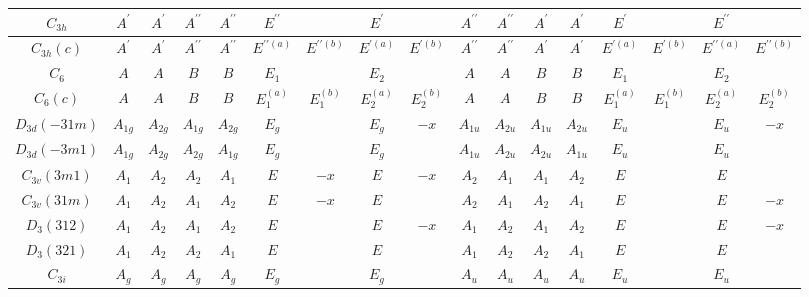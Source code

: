 \documentclass[11pt]{easymemo}
\begin{document}
\begin{landscape}
\begin{table}[ht!]
\begin{center}
\begin{tabular}{c||c|c|c|c|cc|cc||c|c|c|c|cc|cc}
$ C_{3h} $ & $ A^{\prime} $ & $ A^{\prime} $ & $ A^{\prime\prime} $ & $ A^{\prime\prime} $ & $ E^{\prime\prime} $ & & $ E^{\prime} $ & & $ A^{\prime\prime} $ & $ A^{\prime\prime} $ & $ A^{\prime} $ & $ A^{\prime} $ & $ E^{\prime} $ & & $ E^{\prime\prime} $ & \\ \hline
$ C_{3h}(c) $ & $ A^{\prime} $ & $ A^{\prime} $ & $ A^{\prime\prime} $ & $ A^{\prime\prime} $ & $ E^{\prime\prime(a)} $ & $ E^{\prime\prime(b)} $ & $ E^{\prime(a)} $ & $ E^{\prime(b)} $ & $ A^{\prime\prime} $ & $ A^{\prime\prime} $ & $ A^{\prime} $ & $ A^{\prime} $ & $ E^{\prime(a)} $ & $ E^{\prime(b)} $ & $ E^{\prime\prime(a)} $ & $ E^{\prime\prime(b)} $ \\ \hline
$ C_{6} $ & $ A $ & $ A $ & $ B $ & $ B $ & $ E_{1} $ & & $ E_{2} $ & & $ A $ & $ A $ & $ B $ & $ B $ & $ E_{1} $ & & $ E_{2} $ & \\ \hline
$ C_{6}(c) $ & $ A $ & $ A $ & $ B $ & $ B $ & $ E_{1}^{(a)} $ & $ E_{1}^{(b)} $ & $ E_{2}^{(a)} $ & $ E_{2}^{(b)} $ & $ A $ & $ A $ & $ B $ & $ B $ & $ E_{1}^{(a)} $ & $ E_{1}^{(b)} $ & $ E_{2}^{(a)} $ & $ E_{2}^{(b)} $ \\ \hline\hline
$ D_{3d}(-31m) $ & $ A_{1g} $ & $ A_{2g} $ & $ A_{1g} $ & $ A_{2g} $ & $ E_{g} $ & & $ E_{g} $ & $ -x $ & $ A_{1u} $ & $ A_{2u} $ & $ A_{1u} $ & $ A_{2u} $ & $ E_{u} $ & & $ E_{u} $ & $ -x $ \\ \hline
$ D_{3d}(-3m1) $ & $ A_{1g} $ & $ A_{2g} $ & $ A_{2g} $ & $ A_{1g} $ & $ E_{g} $ & & $ E_{g} $ & & $ A_{1u} $ & $ A_{2u} $ & $ A_{2u} $ & $ A_{1u} $ & $ E_{u} $ & & $ E_{u} $ & \\ \hline
$ C_{3v}(3m1) $ & $ A_{1} $ & $ A_{2} $ & $ A_{2} $ & $ A_{1} $ & $ E $ & $ -x $ & $ E $ & $ -x $ & $ A_{2} $ & $ A_{1} $ & $ A_{1} $ & $ A_{2} $ & $ E $ & & $ E $ & \\ \hline
$ C_{3v}(31m) $ & $ A_{1} $ & $ A_{2} $ & $ A_{1} $ & $ A_{2} $ & $ E $ & $ -x $ & $ E $ & & $ A_{2} $ & $ A_{1} $ & $ A_{2} $ & $ A_{1} $ & $ E $ & & $ E $ & $ -x $ \\ \hline
$ D_{3}(312) $ & $ A_{1} $ & $ A_{2} $ & $ A_{1} $ & $ A_{2} $ & $ E $ & & $ E $ & $ -x $ & $ A_{1} $ & $ A_{2} $ & $ A_{1} $ & $ A_{2} $ & $ E $ & & $ E $ & $ -x $ \\ \hline
$ D_{3}(321) $ & $ A_{1} $ & $ A_{2} $ & $ A_{2} $ & $ A_{1} $ & $ E $ & & $ E $ & & $ A_{1} $ & $ A_{2} $ & $ A_{2} $ & $ A_{1} $ & $ E $ & & $ E $ & \\ \hline
$ C_{3i} $ & $ A_{g} $ & $ A_{g} $ & $ A_{g} $ & $ A_{g} $ & $ E_{g} $ & & $ E_{g} $ & & $ A_{u} $ & $ A_{u} $ & $ A_{u} $ & $ A_{u} $ & $ E_{u} $ & & $ E_{u} $ & \\ \hline

\end{tabular}
\end{center}
\end{table}
\end{landscape}
\end{document}
